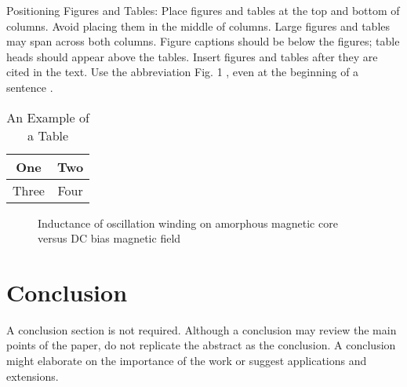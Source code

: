 \documentclass[letterpaper, 10 pt, conference]{ieeeconf} %
\begin{document}
Positioning Figures and Tables: Place figures and tables at the top and bottom of columns. Avoid placing them in the middle of columns. Large figures and tables may span across both columns. Figure captions should be below the figures; table heads should appear above the tables. Insert figures and tables after they are cited in the text. Use the abbreviation Fig. 1 , even at the beginning of a sentence \cite{IEEEexample:shellCTANpage} \cite{IEEEexample:IEEEwebsite}.

\begin{table}[h]
\caption{An Example of a Table}
\label{table_example}
\begin{center}
\begin{tabular}{|c||c|}
\hline
One & Two\\
\hline
Three & Four\\
\hline
\end{tabular}
\end{center}
\end{table}


  \begin{figure}[thpb]
   \centering
   \caption{Inductance of oscillation winding on amorphous
    magnetic core versus DC bias magnetic field}
   \label{figurelabel}
  \end{figure}

\section{Conclusion}

A conclusion section is not required. Although a conclusion may review the main points of the paper, do not replicate the abstract as the conclusion. A conclusion might elaborate on the importance of the work or suggest applications and extensions.





\end{document}
